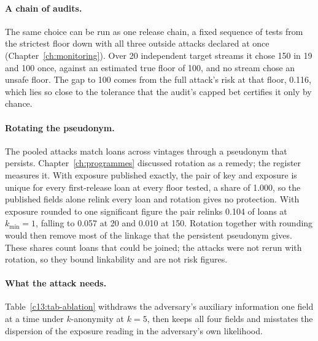 \paragraph{A chain of audits.} The same choice can be run as one release chain, a
fixed sequence of tests from the strictest floor down with all three outside attacks
declared at once (Chapter~\ref{ch:monitoring}). Over 20 independent target streams it
chose 150 in 19 and 100 once, against an estimated true floor of 100, and no stream
chose an unsafe floor. The gap to 100 comes from the full attack's risk at that floor,
0.116, which lies so close to the tolerance that the audit's capped bet certifies it
only by chance.

\paragraph{Rotating the pseudonym.} The pooled attacks match loans across vintages
through a pseudonym that persists. Chapter~\ref{ch:programmes} discussed rotation as a
remedy; the register measures it. With exposure published exactly, the pair of key
and exposure is unique for every first-release loan at every floor tested, a share of
1.000, so the published fields alone relink every loan and rotation gives no
protection. With exposure rounded to one significant figure the pair relinks 0.104 of
loans at $k_{\min}=1$, falling to 0.057 at 20 and 0.010 at 150.
Rotation together with rounding would then remove most of the linkage that the
persistent pseudonym gives. These shares count loans that could be joined; the attacks
were not rerun with rotation, so they bound linkability and are not risk figures.

\paragraph{What the attack needs.} Table~\ref{c13:tab-ablation} withdraws the
adversary's auxiliary information one field at a time under $k$-anonymity at $k=5$,
then keeps all four fields and misstates the dispersion of the exposure reading in
the adversary's own likelihood.

